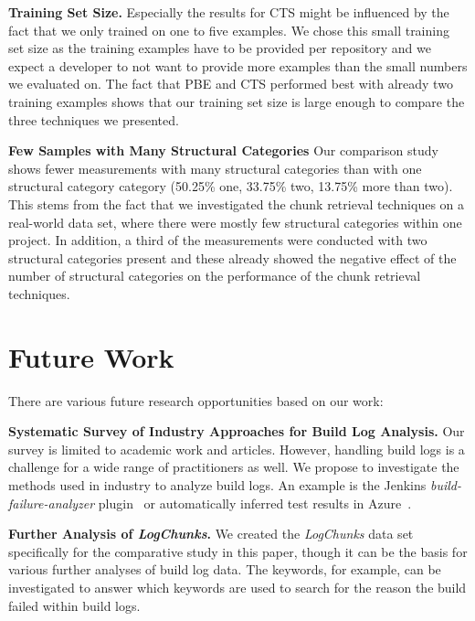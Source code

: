 \textbf{Training Set Size.}
Especially the results for CTS might be influenced by the fact that we
only trained on one to five examples.
We chose this small training set
size as the training examples have to be provided per repository and
we expect a developer to not want to provide more examples than the
small numbers we evaluated on.
The fact that PBE and CTS performed best with already two training
examples shows that our training set size is large enough to
compare the three techniques we presented.

\textbf{Few Samples with Many Structural Categories}
Our comparison study shows fewer measurements with many structural
categories than with one structural category category
(50.25\% one, 33.75\% two, 13.75\% more than two).
This stems from the fact that we investigated the chunk retrieval
techniques on a real-world data set, where there were mostly few
structural categories within one project.
In addition, a third of the measurements were conducted with two
structural categories present and these already showed the negative
effect of the number of structural categories on the performance
of the chunk retrieval techniques.

\section{Future Work}

There are various future research opportunities based on our work:

\textbf{Systematic Survey of Industry Approaches for Build
Log Analysis.}
Our survey is limited to academic work and articles.
However, handling build logs is a challenge for a wide range of
practitioners as well.
We propose to investigate the methods used in industry to analyze
build logs.
An example is the Jenkins \emph{build-failure-analyzer}
plugin~\cite{jenkins2020failure-analyzer} or automatically
inferred test results in Azure~\cite{azure2020inferred}.

\textbf{Further Analysis of \emph{LogChunks}.}
We created the
\emph{LogChunks} data set \cite{brandt2020logchunks} specifically for
the comparative
study in this paper, though it can be the basis for various further
analyses of build log data.
The keywords, for example, can be
investigated to answer which keywords are used to search for the
reason the build failed within build logs.

